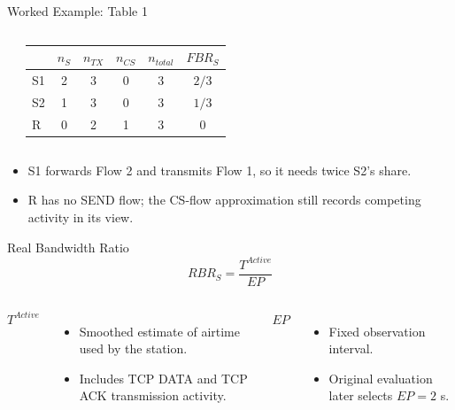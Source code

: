 \begin{frame}{Worked Example: Table 1}
\begin{columns}[T,onlytextwidth]
\begin{center}
\end{center}
\begin{tabular}{lccccc}
\toprule
 & $n_S$ & $n_{TX}$ & $n_{CS}$ & $n_{total}$ & $FBR_S$\\
\midrule
S1 & 2 & 3 & 0 & 3 & $2/3$\\
S2 & 1 & 3 & 0 & 3 & $1/3$\\
R  & 0 & 2 & 1 & 3 & $0$\\
\bottomrule
\end{tabular}
\end{columns}
\vspace{0.55cm}
\begin{itemize}
\item S1 forwards Flow 2 and transmits Flow 1, so it needs twice S2's share.
\item R has no SEND flow; the CS-flow approximation still records competing activity in its view.
\end{itemize}
\end{frame}

\begin{frame}{Real Bandwidth Ratio}
\small
{}
\[
\boxed{RBR_S=\frac{T^{Active}}{EP}}
\]
\begin{columns}[T,onlytextwidth]
\textbf{$T^{Active}$}
\begin{itemize}
\item Smoothed estimate of airtime used by the station.
\item Includes TCP DATA and TCP ACK transmission activity.
\end{itemize}
\textbf{$EP$}
\begin{itemize}
\item Fixed observation interval.
\item Original evaluation later selects $EP=2$ s.
\end{itemize}
\end{columns}
\vspace{0.05cm}
\end{frame}


